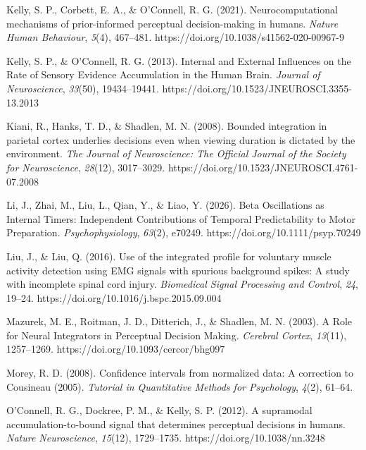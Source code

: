 \begin{references}
Kelly, S. P., Corbett, E. A., \& O'Connell, R. G. (2021). Neurocomputational mechanisms of prior-informed perceptual decision-making in humans. \emph{Nature Human Behaviour}, \emph{5}(4), 467--481. https://doi.org/10.1038/s41562-020-00967-9

Kelly, S. P., \& O'Connell, R. G. (2013). Internal and External Influences on the Rate of Sensory Evidence Accumulation in the Human Brain. \emph{Journal of Neuroscience}, \emph{33}(50), 19434--19441. https://doi.org/10.1523/JNEUROSCI.3355-13.2013

Kiani, R., Hanks, T. D., \& Shadlen, M. N. (2008). Bounded integration in parietal cortex underlies decisions even when viewing duration is dictated by the environment. \emph{The Journal of Neuroscience: The Official Journal of the Society for Neuroscience}, \emph{28}(12), 3017--3029. https://doi.org/10.1523/JNEUROSCI.4761-07.2008

Li, J., Zhai, M., Liu, L., Qian, Y., \& Liao, Y. (2026). Beta Oscillations as Internal Timers: Independent Contributions of Temporal Predictability to Motor Preparation. \emph{Psychophysiology}, \emph{63}(2), e70249. https://doi.org/10.1111/psyp.70249

Liu, J., \& Liu, Q. (2016). Use of the integrated profile for voluntary muscle activity detection using EMG signals with spurious background spikes: A study with incomplete spinal cord injury. \emph{Biomedical Signal Processing and Control}, \emph{24}, 19--24. https://doi.org/10.1016/j.bspc.2015.09.004

Mazurek, M. E., Roitman, J. D., Ditterich, J., \& Shadlen, M. N. (2003). A Role for Neural Integrators in Perceptual Decision Making. \emph{Cerebral Cortex}, \emph{13}(11), 1257--1269. https://doi.org/10.1093/cercor/bhg097

Morey, R. D. (2008). Confidence intervals from normalized data: A correction to Cousineau (2005). \emph{Tutorial in Quantitative Methods for Psychology}, \emph{4}(2), 61--64.

 \del{,} 

O'Connell, R. G., Dockree, P. M., \& Kelly, S. P. (2012). A supramodal accumulation-to-bound signal that determines perceptual decisions in humans. \emph{Nature Neuroscience}, \emph{15}(12), 1729--1735. https://doi.org/10.1038/nn.3248


\end{references}
